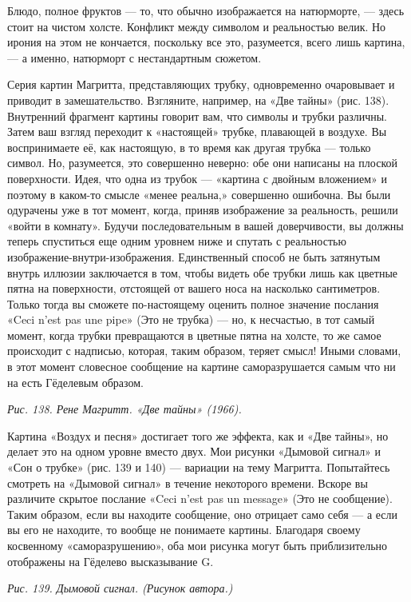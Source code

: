 \documentclass[../main.tex]{subfiles}
\begin{document}
Блюдо, полное фруктов --- то, что обычно изображается на натюрморте, --- здесь стоит на чистом холсте. Конфликт между символом и реальностью велик. Но ирония на этом не кончается, поскольку все это, разумеется, всего лишь картина, --- а именно, натюрморт с нестандартным сюжетом.

Серия картин Магритта, представляющих трубку, одновременно очаровывает и приводит в замешательство. Взгляните, например, на «Две тайны» (рис. 138). Внутренний фрагмент картины говорит вам, что символы и трубки различны. Затем ваш взгляд переходит к «настоящей» трубке, плавающей в воздухе. Вы воспринимаете её, как настоящую, в то время как другая трубка --- только символ. Но, разумеется, это совершенно неверно: обе они написаны на плоской поверхности. Идея, что одна из трубок --- «картина с двойным вложением» и поэтому в каком-то смысле «менее реальна,» совершенно ошибочна. Вы были одурачены уже в тот момент, когда, приняв изображение за реальность, решили «войти в комнату». Будучи последовательным в вашей доверчивости, вы должны теперь спуститься еще одним уровнем ниже и спутать с реальностью изображение-внутри-изображения. Единственный способ не быть затянутым внутрь иллюзии заключается в том, чтобы видеть обе трубки лишь как цветные пятна на поверхности, отстоящей от вашего носа на насколько сантиметров. Только тогда вы сможете по-настоящему оценить полное значение послания «Ceci n'est pas une pipe» (Это не трубка) --- но, к несчастью, в тот самый момент, когда трубки превращаются в цветные пятна на холсте, то же самое происходит с надписью, которая, таким образом, теряет смысл! Иными словами, в этот момент словесное сообщение на картине саморазрушается самым что ни на есть Гёделевым образом.

\emph{Рис. 138. Рене Магритт. «Две тайны» (1966).}

Картина «Воздух и песня» достигает того же эффекта, как и «Две тайны», но делает это на одном уровне вместо двух. Мои рисунки «Дымовой сигнал» и «Сон о трубке» (рис. 139 и 140) --- вариации на тему Магритта. Попытайтесь смотреть на «Дымовой сигнал» в течение некоторого времени. Вскоре вы различите скрытое послание «Ceci n'est pas un message» (Это не сообщение). Таким образом, если вы находите сообщение, оно отрицает само себя --- а если вы его не находите, то вообще не понимаете картины. Благодаря своему косвенному «саморазрушению», оба мои рисунка могут быть приблизительно отображены на Гёделево высказывание G.

\emph{Рис. 139. Дымовой сигнал. (Рисунок автора.)}
\end{document}
